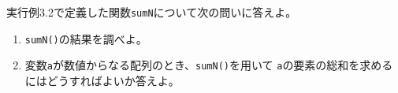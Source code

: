  \begin{Prob}\upshape\Must
  実行例3.2で定義した関数\texttt{sumN}について次の問いに答えよ。
  \begin{enumerate}
   \item \texttt{sumN()}の結果を調べよ。
         \ifText\\[0.03\textheight]\fi
   \item 変数\texttt{a}が数値からなる配列のとき、\texttt{sumN()}を用いて
         \texttt{a}の要素の総和を求めるにはどうすればよいか答えよ。
         \ifText\\[0.03\textheight]\fi
  \end{enumerate}
\end{Prob}
